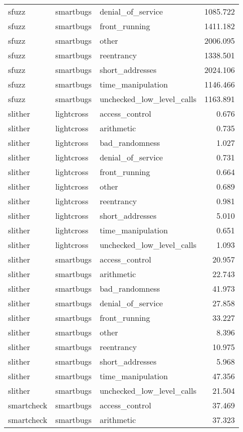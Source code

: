 \begin{tabular}[t]{lllr}
sfuzz & smartbugs & denial\_of\_service & 1085.722\\
sfuzz & smartbugs & front\_running & 1411.182\\
\addlinespace
sfuzz & smartbugs & other & 2006.095\\
sfuzz & smartbugs & reentrancy & 1338.501\\
sfuzz & smartbugs & short\_addresses & 2024.106\\
sfuzz & smartbugs & time\_manipulation & 1146.466\\
sfuzz & smartbugs & unchecked\_low\_level\_calls & 1163.891\\
\addlinespace
slither & lightcross & access\_control & 0.676\\
slither & lightcross & arithmetic & 0.735\\
slither & lightcross & bad\_randomness & 1.027\\
slither & lightcross & denial\_of\_service & 0.731\\
slither & lightcross & front\_running & 0.664\\
\addlinespace
slither & lightcross & other & 0.689\\
slither & lightcross & reentrancy & 0.981\\
slither & lightcross & short\_addresses & 5.010\\
slither & lightcross & time\_manipulation & 0.651\\
slither & lightcross & unchecked\_low\_level\_calls & 1.093\\
\addlinespace
slither & smartbugs & access\_control & 20.957\\
slither & smartbugs & arithmetic & 22.743\\
slither & smartbugs & bad\_randomness & 41.973\\
slither & smartbugs & denial\_of\_service & 27.858\\
slither & smartbugs & front\_running & 33.227\\
\addlinespace
slither & smartbugs & other & 8.396\\
slither & smartbugs & reentrancy & 10.975\\
slither & smartbugs & short\_addresses & 5.968\\
slither & smartbugs & time\_manipulation & 47.356\\
slither & smartbugs & unchecked\_low\_level\_calls & 21.504\\
\addlinespace
smartcheck & smartbugs & access\_control & 37.469\\
smartcheck & smartbugs & arithmetic & 37.323\\

\end{tabular}
